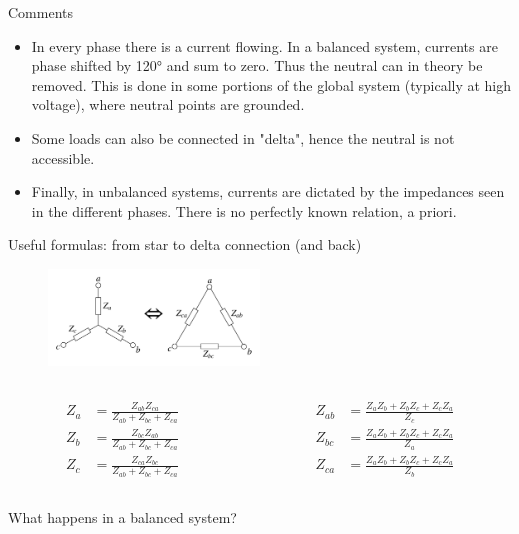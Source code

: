 \begin{frame}{Comments}
    \begin{itemize}
        \item In every phase there is a current flowing. In a balanced system, currents are phase shifted by 120° and sum to zero. Thus the neutral can in theory be removed. This is done in some portions of the global system (typically at high voltage), where neutral points are grounded.
        \item Some loads can also be connected in "delta", hence the neutral is not accessible.
        \item Finally, in unbalanced systems, currents are dictated by the impedances seen in the different phases. There is no perfectly known relation, a priori.
    \end{itemize}
\end{frame}

\begin{frame}{Useful formulas: from star to delta connection (and back)}
    \begin{figure}
        \centering
        \includegraphics[width=0.5\textwidth]{images/star_delta.png}
    \end{figure}
    \begin{columns}
        \begin{column}{0.5\textwidth}
            $$ \begin{aligned}
            Z_a &= \frac{Z_{ab}Z_{ca}}{Z_{ab} + Z_{bc} + Z_{ca}} \\
            Z_b &= \frac{Z_{bc}Z_{ab}}{Z_{ab} + Z_{bc} + Z_{ca}} \\
            Z_c &= \frac{Z_{ca}Z_{bc}}{Z_{ab} + Z_{bc} + Z_{ca}}
            \end{aligned}$$
        \end{column}
        \begin{column}{0.5\textwidth}
            $$ \begin{aligned}
            Z_{ab} &= \frac{Z_{a}Z_{b}+Z_{b}Z_{c}+Z_{c}Z_{a}}{Z_{c}} \\
            Z_{bc} &= \frac{Z_{a}Z_{b}+Z_{b}Z_{c}+Z_{c}Z_{a}}{Z_{a}} \\
            Z_{ca} &= \frac{Z_{a}Z_{b}+Z_{b}Z_{c}+Z_{c}Z_{a}}{Z_{b}}
            \end{aligned}$$
        \end{column}
    \end{columns}
    What happens in a balanced system?
\end{frame}

